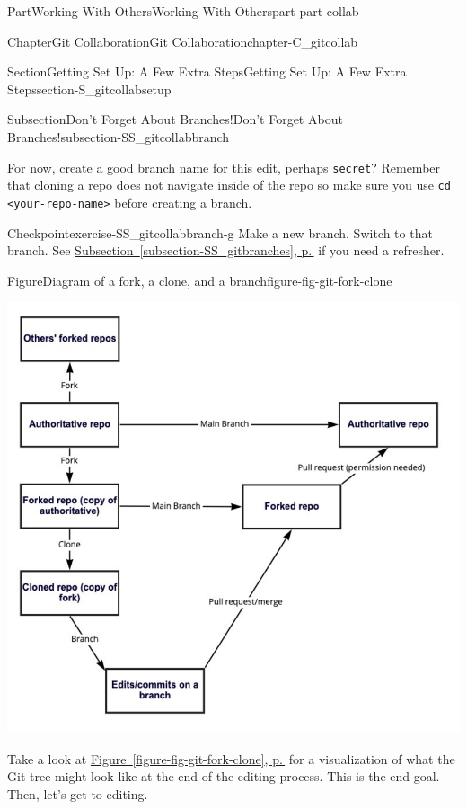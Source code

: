 \documentclass[twoside,10pt,]{book}
\newcommand{\xreffont}{\relax}
\newcommand{\mono}[1]{\texttt{#1}}
\begin{document}
\begin{partptx}{Part}{Working With Others}{}{Working With Others}{}{}{part-part-collab}
\begin{chapterptx}{Chapter}{Git Collaboration}{}{Git Collaboration}{}{}{chapter-C_gitcollab}
\begin{sectionptx}{Section}{Getting Set Up: A Few Extra Steps}{}{Getting Set Up: A Few Extra Steps}{}{}{section-S_gitcollabsetup}
\begin{subsectionptx}{Subsection}{Don't Forget About Branches!}{}{Don't Forget About Branches!}{}{}{subsection-SS_gitcollabbranch}
\par
For now, create a good branch name for this edit, perhaps \mono{secret}? Remember that cloning a repo does not navigate inside of the repo so make sure you use \mono{cd <your-repo-name>} before creating a branch.%
\begin{inlineexercise}{Checkpoint}{}{exercise-SS_gitcollabbranch-g}%
Make a new branch. Switch to that branch. See \hyperref[subsection-SS_gitbranches]{Subsection~{\xreffont\ref{subsection-SS_gitbranches}}, p.\,\pageref{subsection-SS_gitbranches}} if you need a refresher.%
\end{inlineexercise}%
\begin{figureptx}{Figure}{Diagram of a fork, a clone, and a branch}{figure-fig-git-fork-clone}{}%
\begin{image}{0.1}{0.8}{0.1}{}%
\includegraphics[width=\linewidth]{external/git_fork_clone.pdf}
\end{image}%
\tcblower
\end{figureptx}%
Take a look at \hyperref[figure-fig-git-fork-clone]{Figure~{\xreffont\ref{figure-fig-git-fork-clone}}, p.\,\pageref{figure-fig-git-fork-clone}} for a visualization of what the Git tree might look like at the end of the editing process. This is the end goal. Then, let's get to editing.%
\end{subsectionptx}
\end{sectionptx}
%
%
\typeout{************************************************}

\end{chapterptx}
\end{partptx}
\end{document}
